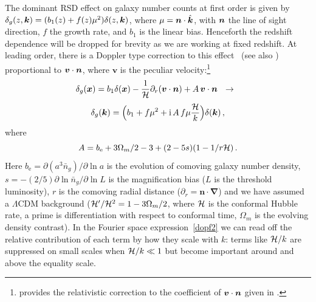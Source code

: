 The dominant RSD effect on galaxy number counts at first order is given by $\delta_g(z,\bm {k}) = (b_{1}(z) + f (z) \mu^{2})\delta(z,\bm {k})$, where $\mu=\bm {n}\cdot\hat{\bm {k}}$, with $\bm {n}$ the line of sight direction, $f$ the growth rate, and $b_1$ is the linear bias. Henceforth the redshift dependence will be dropped for brevity as we are working at fixed redshift. At leading order, there is a Doppler type correction to this effect~\citep{Kaiser:1987qv,McDonald:2009dh,Challinor:2011bk} (see also \citep{Raccanelli:2016avd,Hall:2016bmm,Abramo:2017xnp}) proportional to $\bm{v}\cdot\bm {n}$, where $\bm{v}$ is the peculiar velocity:\footnote{\citep{Challinor:2011bk} provides the relativistic correction to the coefficient of  $\bm{v}\cdot\bm {n}$ given in \citep{Kaiser:1987qv,McDonald:2009dh}.}
\begin{equation} \label{dopf}
\delta_g(\bm {x}) = b_{1} \delta(\bm {x})-{\frac{1}{\mathcal{H}}}\partial_r(\bm{v}\cdot\bm {n}) +{A}\,\bm{v}\cdot\bm {n} ~~\to~~
\end{equation}
\begin{equation} \delta_g(\bm {k})=\Big(b_1+f\mu^2+\mathrm{i\,} {A}\,f \mu{\frac{\mathcal{H}}{k}}\Big)\delta(\bm {k})\,,\label{dopf2}
\end{equation}
where  
\begin{equation}
{A} = {b_{\textrm{e}}+{3}\Omega_m/2 -3 + (2-5s) (1-{1/ r\mathcal{H}} )}\,.
\end{equation}
Here $b_{\textrm{e}}=\partial (a^3 \bar{n}_g)/\partial \ln a$ is the evolution of comoving galaxy number density, $s=-(2/5)\partial \ln \bar{n}_g/\partial \ln L$ is the magnification bias ($L$ is the threshold luminosity), $r$ is the comoving radial distance ($\partial_r=\bm n\cdot\bm\nabla$) and we have assumed a $\Lambda$CDM background ($\mathcal{H}'/\mathcal{H}^2=1-3\Omega_m/2$, where $\mathcal{H}$ is the conformal Hubble rate, a prime is differentiation with respect to conformal time, $\Omega_m$ is the evolving density contrast). In the  Fourier space expression~\eqref{dopf2} we can read off the relative contribution of each term by how they scale with $k$: terms like $\mathcal{H}/k$ are suppressed on small scales when $\mathcal{H}/k\ll1$ but become important around and above the equality scale. 


